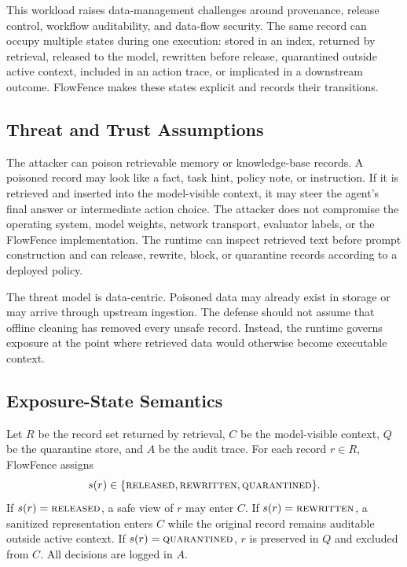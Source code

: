 \documentclass[conference]{IEEEtran}
\begin{document}
This workload raises data-management challenges around provenance, release control, workflow auditability, and data-flow security. The same record can occupy multiple states during one execution: stored in an index, returned by retrieval, released to the model, rewritten before release, quarantined outside active context, included in an action trace, or implicated in a downstream outcome. FlowFence makes these states explicit and records their transitions.

\subsection{Threat and Trust Assumptions}

The attacker can poison retrievable memory or knowledge-base records. A poisoned record may look like a fact, task hint, policy note, or instruction. If it is retrieved and inserted into the model-visible context, it may steer the agent's final answer or intermediate action choice. The attacker does not compromise the operating system, model weights, network transport, evaluator labels, or the FlowFence implementation. The runtime can inspect retrieved text before prompt construction and can release, rewrite, block, or quarantine records according to a deployed policy.

The threat model is data-centric. Poisoned data may already exist in storage or may arrive through upstream ingestion. The defense should not assume that offline cleaning has removed every unsafe record. Instead, the runtime governs exposure at the point where retrieved data would otherwise become executable context.

\subsection{Exposure-State Semantics}

Let $R$ be the record set returned by retrieval, $C$ be the model-visible context, $Q$ be the quarantine store, and $A$ be the audit trace. For each record $r \in R$, FlowFence assigns
\begin{equation}
    s(r) \in \{\textsc{released},\textsc{rewritten},\textsc{quarantined}\}.
\end{equation}
If $s(r)=\textsc{released}$, a safe view of $r$ may enter $C$. If $s(r)=\textsc{rewritten}$, a sanitized representation enters $C$ while the original record remains auditable outside active context. If $s(r)=\textsc{quarantined}$, $r$ is preserved in $Q$ and excluded from $C$. All decisions are logged in $A$.
\end{document}
